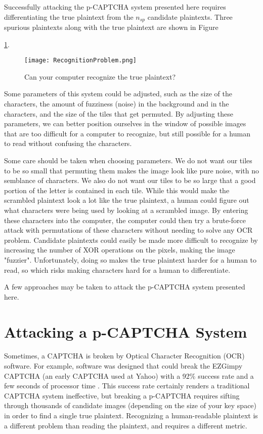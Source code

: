 \documentclass[12pt]{article}
\begin{document}
Successfully attacking the p-CAPTCHA system presented here requires differentiating the true plaintext from the $n_{sp}$ candidate plaintexts. Three spurious plaintexts along with the true plaintext are shown in Figure~{\ref{RecognitionProblem}.

\begin{figure}
	\begin{center}
		\texttt{[image: RecognitionProblem.png]}
	\end{center}
	\caption{Can your computer recognize the true plaintext?}
\label{RecognitionProblem}
\end{figure}

Some parameters of this system could be adjusted, such as the size of the characters, the amount of fuzziness (noise) in the background and in the characters, and the size of the tiles that get permuted. By adjusting these parameters, we can better position ourselves in the window of possible images that are too difficult for a computer to recognize, but still possible for a human to read without confusing the characters.

Some care should be taken when choosing parameters. We do not want our tiles to be so small that permuting them makes the image look like pure noise, with no semblance of characters. We also do not want our tiles to be so large that a good portion of the letter is contained in each tile. While this would make the scrambled plaintext look a lot like the true plaintext, a human could figure out what characters were being used by looking at a scrambled image. By entering these characters into the computer, the computer could then try a brute-force attack with permutations of these characters without needing to solve any OCR problem. Candidate plaintexts could easily be made more difficult to recognize by increasing the number of XOR operations on the pixels, making the image "fuzzier". Unfortunately, doing so makes the true plaintext harder for a human to read, so which risks making characters hard for a human to differentiate.

A few approaches may be taken to attack the p-CAPTCHA system presented here. 

\section*{Attacking a p-CAPTCHA System}
Sometimes, a CAPTCHA is broken by Optical Character Recognition (OCR) software. For example, software was designed that could break the EZGimpy CAPTCHA (an early CAPTCHA used at Yahoo) with a 92\% success rate and a few seconds of processor time \cite{mori}. This success rate certainly renders a traditional CAPTCHA system ineffective, but breaking a p-CAPTCHA requires sifting through thousands of candidate images (depending on the size of your key space) in order to find a single true plaintext. Recognizing a human-readable plaintext is a different problem than reading the plaintext, and requires a different metric.

}
\end{document}
